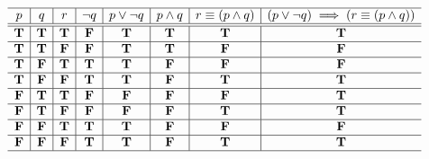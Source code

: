 \begin{example}
\hfill$ \begin{array}{c|c|c|c|c|c|c|c}
  \hline  
  p 			& q 				& r				&\neg q&p\lor \neg q	& p \land q&r \equiv ( p \land q)	&(p\lor \neg q) \implies (r \equiv ( p \land q))\\
  \hline
  \hline
 \mathbf{T} &  \mathbf{T} 	&  \mathbf{T} 	&  \mathbf{F} 	&  \mathbf{T} 	&  \mathbf{T}	&  \mathbf{T}	&  \mathbf{T}\\
  \hline
 \mathbf{T} &  \mathbf{T} 	&  \mathbf{F}  	&  \mathbf{F} 	&  \mathbf{T} 	&  \mathbf{T}	&  \mathbf{F}	&  \mathbf{F}\\
  \hline
 \mathbf{T} &  \mathbf{F} 	&  \mathbf{T}  	&  \mathbf{T} 	&  \mathbf{T} 	&  \mathbf{F}	&  \mathbf{F}	&  \mathbf{F}\\
  \hline
 \mathbf{T} &  \mathbf{F} 	&  \mathbf{F}  	&  \mathbf{T} 	&  \mathbf{T} 	&  \mathbf{F}	&  \mathbf{T}	&  \mathbf{T}\\
\hline
 \mathbf{F} &  \mathbf{T} 	&  \mathbf{T} 	&  \mathbf{F} 	&  \mathbf{F} 	&  \mathbf{F}	&  \mathbf{F}	&  \mathbf{T}\\
  \hline
 \mathbf{F} &  \mathbf{T} 	&  \mathbf{F}  	&  \mathbf{F} 	&  \mathbf{F} 	&  \mathbf{F}	&  \mathbf{T}	&  \mathbf{T}\\
  \hline
 \mathbf{F} &  \mathbf{F} 	&  \mathbf{T}  	&  \mathbf{T} 	&  \mathbf{T} 	&  \mathbf{F}	&  \mathbf{F}	&  \mathbf{F}\\
  \hline
 \mathbf{F} &  \mathbf{F} 	&  \mathbf{F}  	&  \mathbf{T} 	&  \mathbf{T} 	&  \mathbf{F}	&  \mathbf{T}	&  \mathbf{T}\\
    \hline
    \end{array}$
\color{black}   
\fi 
\end{example}
  
